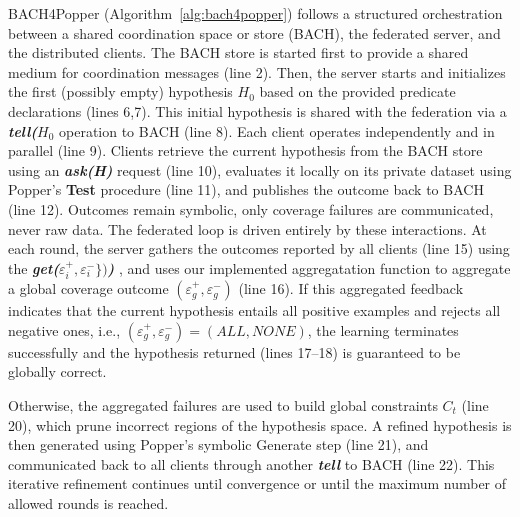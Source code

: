 BACH4Popper (Algorithm~\ref{alg:bach4popper}) follows a structured orchestration between a shared coordination space or store (BACH), the federated server, and the distributed clients. The BACH store is started first to provide a shared medium for coordination messages (line 2).
Then, the server starts and initializes the first (possibly empty) hypothesis $H_0$ based on the provided predicate declarations (lines 6,7). This initial hypothesis is shared with the federation via a \textbf{\emph{tell($H_0$}} operation to BACH (line 8). Each client operates independently and in parallel (line 9). Clients retrieve the current hypothesis from the BACH store using an \textbf{\emph{ask(H)}} request (line 10), evaluates it locally on its private dataset using Popper’s \textbf{Test} procedure (line 11), and publishes the outcome back to BACH (line 12). Outcomes remain symbolic, only coverage failures are communicated, never raw data. The federated loop is driven entirely by these interactions.
At each round, the server gathers the outcomes reported by all clients (line 15) using the \textbf{\emph{get($\varepsilon_i^+, \varepsilon_i^- \})$)}} , and uses our implemented aggregatation function to aggregate a global coverage outcome  $(\varepsilon^+_g, \varepsilon^-_g)$ (line 16).
If this aggregated feedback indicates that the current hypothesis entails all positive examples and rejects all negative ones, i.e., 
$(\varepsilon^+_g,\varepsilon^-_g)= (ALL, NONE)$, the learning terminates successfully and the hypothesis returned (lines 17–18) is guaranteed to be globally correct.

Otherwise, the aggregated failures are used to build global constraints $C_t$ (line 20), which prune incorrect regions of the hypothesis space.
A refined hypothesis is then generated using Popper’s symbolic Generate step (line 21), and communicated back to all clients through another \textbf{\emph{tell}} to BACH (line 22).
This iterative refinement continues until convergence or until the maximum number of allowed rounds is reached.


